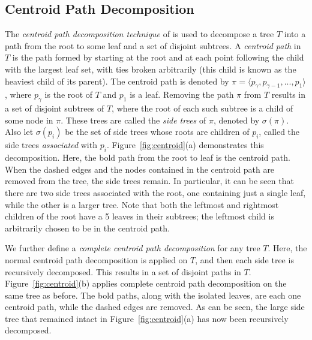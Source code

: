 \documentclass{article}
\begin{document}
    \subsection{Centroid Path Decomposition}

    The \textit{centroid path decomposition technique} of \cite{cole2000n} is used to decompose a tree $T$ into a path from the root to some leaf and a set of disjoint subtrees. A \textit{centroid path} in $T$ is the path formed by starting at the root and at each point following the child with the largest leaf set, with ties broken arbitrarily (this child is known as the heaviest child of its parent). The centroid path is denoted by $\pi = \langle p_{\gamma}, p_{\gamma - 1}, ..., p_1 \rangle$, where $p_{\gamma}$ is the root of $T$ and $p_1$ is a leaf. Removing the path $\pi$ from $T$ results in a set of disjoint subtrees of $T$, where the root of each such subtree is a child of some node in $\pi$. These trees are called the \textit{side trees} of $\pi$, denoted by $\sigma(\pi)$. Also let $\sigma(p_i)$ be the set of side trees whose roots are children of $p_i$, called the side trees \textit{associated} with $p_i$. Figure~\ref{fig:centroid}(a) demonstrates this decomposition. Here, the bold path from the root to leaf is the centroid path. When the dashed edges and the nodes contained in the centroid path are removed from the tree, the side trees remain. In particular, it can be seen that there are two side trees associated with the root, one containing just a single leaf, while the other is a larger tree. Note that both the leftmost and rightmost children of the root have a 5 leaves in their subtrees; the leftmost child is arbitrarily chosen to be in the centroid path.

    We further define a \textit{complete centroid path decomposition} for any tree $T$. Here, the normal centroid path decomposition is applied on $T$, and then each side tree is recursively decomposed. This results in a set of disjoint paths in $T$. Figure~\ref{fig:centroid}(b) applies complete centroid path decomposition on the same tree as before. The bold paths, along with the isolated leaves, are each one centroid path, while the dashed edges are removed. As can be seen, the large side tree that remained intact in Figure~\ref{fig:centroid}(a) has now been recursively decomposed.
\end{document}
